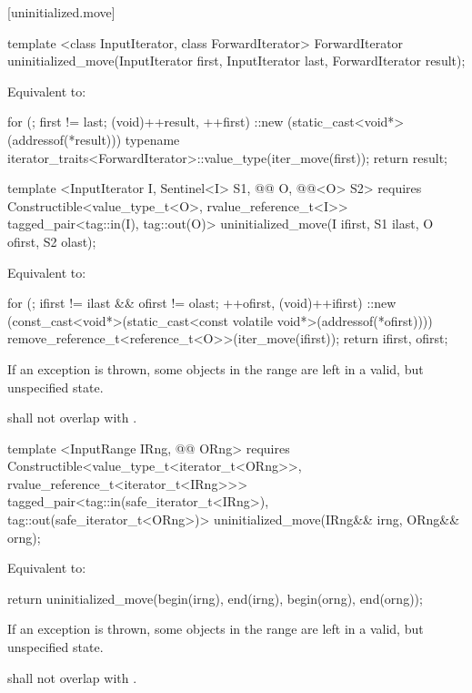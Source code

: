 [uninitialized.move]{}
{\color{remclr}
\begin{codeblock}
template <class InputIterator, class ForwardIterator>
  ForwardIterator uninitialized_move(InputIterator first, InputIterator last,
                                     ForwardIterator result);
\end{codeblock}

\setcounter{Paras}{0}
\pnum
\effects Equivalent to:
\begin{codeblock}
    for (; first != last; (void)++result, ++first)
      ::new (static_cast<void*>(addressof(*result)))
        typename iterator_traits<ForwardIterator>::value_type(iter_move(first));
    return result;
\end{codeblock}
} %
{\color{addclr}
\begin{codeblock}
template <InputIterator I, Sentinel<I> S1, @@ O, @@<O> S2>
  requires
Constructible<value_type_t<O>, rvalue_reference_t<I>>
  tagged_pair<tag::in(I), tag::out(O)>
uninitialized_move(I ifirst, S1 ilast, O ofirst, S2 olast);
\end{codeblock}

\setcounter{Paras}{0}
\pnum
\effects Equivalent to:
\begin{codeblock}
    for (; ifirst != ilast && ofirst != olast; ++ofirst, (void)++ifirst) {
      ::new (const_cast<void*>(static_cast<const volatile void*>(addressof(*ofirst))))
        remove_reference_t<reference_t<O>>(iter_move(ifirst));
    }
    return {ifirst, ofirst};
\end{codeblock}
} %

\pnum
\remarks If an exception is thrown, some objects in the range  are left in a
valid, but unspecified state.

{\color{addclr}
\pnum
\requires {} shall not overlap with .


\begin{codeblock}
template <InputRange IRng, @@ ORng>
  requires
Constructible<value_type_t<iterator_t<ORng>>, rvalue_reference_t<iterator_t<IRng>>>
  tagged_pair<tag::in(safe_iterator_t<IRng>), tag::out(safe_iterator_t<ORng>)>
uninitialized_move(IRng&& irng, ORng&& orng);
\end{codeblock}

\pnum
\effects Equivalent to:
\begin{codeblock}
    return uninitialized_move(begin(irng), end(irng), begin(orng), end(orng));
\end{codeblock}

\pnum
\remarks If an exception is thrown, some objects in the range  are left
in a valid, but unspecified state.

\pnum
\requires {} shall not overlap with .
} %

